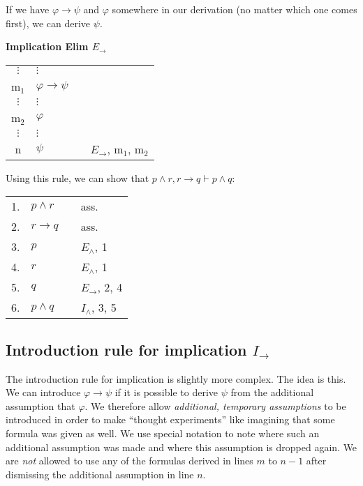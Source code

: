 \documentclass[nobib,nofonts]{tufte-handout}
\begin{document}
If we have $\varphi \rightarrow \psi$ and $\varphi$ somewhere in our derivation (no matter which one comes first), we can derive $\psi$.

\bigskip
\noindent \colorbox{mygray!60}{\centering
  \begin{minipage}[t]{0.35\linewidth}
    \textbf{Implication Elim $E_{\rightarrow}$}
  \end{minipage}
  \begin{minipage}[t]{0.55\linewidth}
    \begin{tabular}{clcl}
      $\vdots$ & $\vdots$                   & \\
      m$_{1}$  & $\varphi \rightarrow \psi$ &  \\
      $\vdots$ & $\vdots$                   & \\
      m$_{2}$  & $\varphi$                  &  \\
      $\vdots$ & $\vdots$                   & \\
      n        & $\psi$                     & & $E_{\rightarrow}$, m$_{1}$, m$_{2}$
    \end{tabular}
  \end{minipage}
}
\bigskip

Using this rule, we can show that $p \wedge r, r \rightarrow q \vdash p \wedge q$:

\begin{tabular}{clcl}
  1. & $p \wedge r$      & & ass. \\
  2. & $r \rightarrow q$ & & ass.  \\
  3. & $p$               & & $E_{\wedge}$, 1  \\
  4. & $r$               & & $E_{\wedge}$, 1  \\
  5. & $q$               & & $E_{\rightarrow}$, 2, 4 \\
  6. & $p \wedge q$      & & $I_{\wedge}$, 3, 5
\end{tabular}

\subsection{Introduction rule for implication $I_{\rightarrow}$}

The introduction rule for implication is slightly more complex.
The idea is this.
We can introduce $\varphi \rightarrow \psi$ if it is possible to derive $\psi$ from the additional assumption that $\varphi$.
We therefore allow \emph{additional, temporary assumptions} to be introduced in order to make ``thought experiments'' like imagining that some formula was given as well.
We use special notation to note where such an additional assumption was made and where this assumption is dropped again.
We are \emph{not} allowed to use any of the formulas derived in lines $m$ to $n-1$ after dismissing the additional assumption in line $n$.
\end{document}
